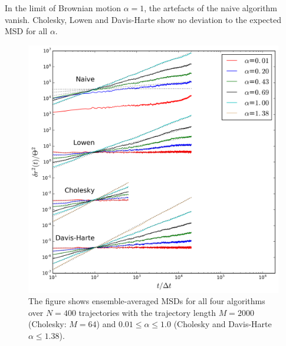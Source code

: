 \documentclass[
  a4paper,BCOR10mm,twoside,
  headsepline,footsepline,%
  fleqn,openbib
]{scrbook}
\begin{document}
In the limit of Brownian motion $\alpha=1$, the artefacts of the naive algorithm  vanish. Cholesky, Lowen and Davis-Harte show no deviation to the expected MSD for all $\alpha$. \par
\begin{figure}[h!]
\centering
\includegraphics[width=\textwidth]{./data/alpha_changethreeneu.png}
\caption{The figure shows ensemble-averaged MSDs for all four algorithms over $N=400$ trajectories with the trajectory length $M=2000$ (Cholesky: $M=64$) and $0.01\leq\alpha\leq1.0$ (Cholesky and Davis-Harte $\alpha\leq1.38$).}
\label{alphachange}
\end{figure}
\end{document}
